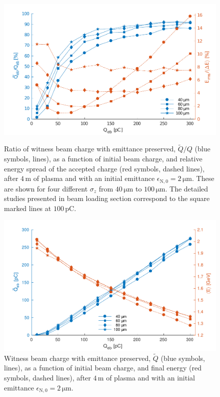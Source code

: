 \documentclass[aps,prstab,reprint,amsmath,amssymb,groupedaddress]{revtex4-1}
\newcommand{\unit}[1]{\,\mathrm{#1}}
\begin{document}
\begin{figure}[hbt]
    \begin{minipage}[t]{.48\textwidth}
        \includegraphics[width=\linewidth,trim={2mm 0mm 2mm 0mm},clip]{figures/beamQuality}
        \caption{\label{Fig:BeamQ} Ratio of witness beam charge with emittance preserved, $\widetilde{Q}/Q$ (blue
            symbols, lines), as a function of initial beam charge, and relative energy spread of the accepted charge
            (red symbols, dashed lines), after $4\unit{m}$ of plasma and with an initial emittance
            $\epsilon_{\mathrm{N},0}=2\unit{\mu m}$. These are shown for four different $\sigma_{z}$ from
            $40\unit{\mu m}$ to $100\unit{\mu m}$. The detailed studies presented in beam loading section correspond to
            the square marked lines at $100\unit{pC}$.}
    \end{minipage}\hfill
    \begin{minipage}[t]{.48\textwidth}
        \includegraphics[width=\linewidth,trim={2mm 0mm 2mm 0mm},clip]{figures/beamQualityAbs}
        \caption{\label{Fig:BeamQAbs} Witness beam charge with emittance preserved, $\widetilde{Q}$ (blue symbols,
            lines), as a function of initial beam charge, and final energy (red symbols, dashed lines), after
            $4\unit{m}$ of plasma and with an initial emittance $\epsilon_{\mathrm{N},0}=2\unit{\mu m}$.}
    \end{minipage}
\end{figure}
\end{document}

